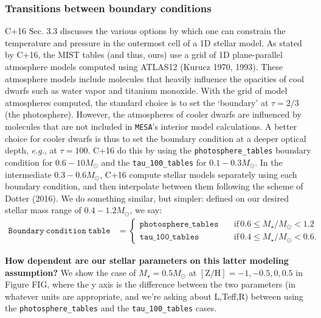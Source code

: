 \documentclass{article}
\begin{document}
\subsubsection{Transitions between boundary conditions}
C+16 Sec. 3.3 discusses the various options by which one can constrain the 
temperature and pressure in the outermost cell of a 1D stellar model.
As stated by C+16, the MIST tables (and thus, ours) use a grid 
of 1D plane-parallel atmosphere models computed using ATLAS12 (Kurucz 1970, 
1993). These atmosphere models include molecules that heavily influence the 
opacities of cool dwarfs such as water vapor and titanium monoxide.
With the grid of model atmospheres computed, the standard choice is to set the 
`boundary' at $\tau=2/3$ (the photosphere).
However, the atmospheres of cooler dwarfs are influenced by molecules that are 
not included in \texttt{MESA}'s interior model calculations.
A better choice for cooler dwarfs is thus to set the boundary condition 
at a deeper optical depth, \textit{e.g.}, at $\tau=100$.
C+16 do this by using the \texttt{photosphere\_tables} boundary condition 
for $0.6-10M_\odot$ and the \texttt{tau\_100\_tables} for $0.1-0.3M_\odot$. In 
the intermediate $0.3-0.6M_\odot$, C+16 compute stellar models separately 
using each boundary condition, and then interpolate between them following the 
scheme of Dotter (2016).
We do something similar, but simpler: defined on our desired stellar mass range 
of $0.4-1.2M_\odot$, we say: 
\begin{align}
\mathtt{Boundary\ condition\ table} &=
\begin{cases}
\mathtt{photosphere\_tables} \quad 
&\mathrm{if}\,0.6\leq M_\star/M_\odot<1.2\\
\mathtt{tau\_100\_tables} \quad 
&\mathrm{if}\,0.4\leq M_\star/M_\odot<0.6.
\end{cases}
\end{align}

\textbf{How dependent are our stellar parameters on this latter modeling 
assumption?} We 
show the case of $M_\star=0.5M_\odot$ at $\mathrm{[Z/H]}=-1,-0.5,0,0.5$ in 
Figure FIG, where the y axis is the difference between the two parameters (in 
whatever units are appropriate, and we're asking about L,Teff,R) between using 
the \texttt{photosphere\_tables} and the \texttt{tau\_100\_tables} cases.
\end{document}
